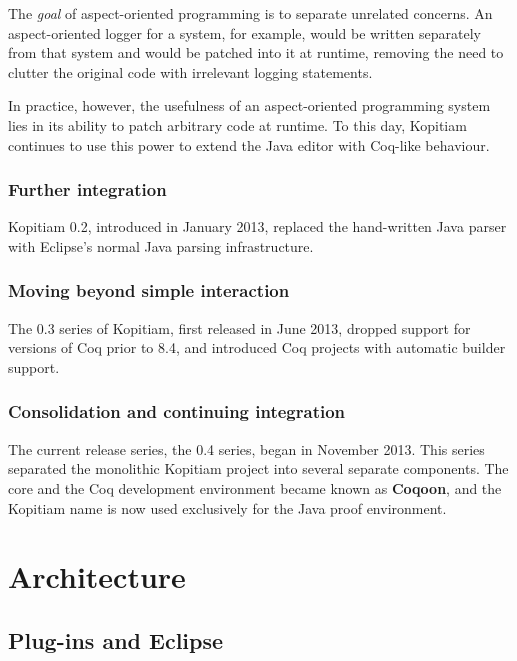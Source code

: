 \documentclass{article}
\newcommand{\name}[1]{\textbf{#1}}
\begin{document}
The \emph{goal} of aspect-oriented programming is to separate unrelated
concerns. An aspect-oriented logger for a system, for example, would be written
separately from that system and would be patched into it at runtime, removing
the need to clutter the original code with irrelevant logging statements.

In practice, however, the usefulness of an aspect-oriented programming system
lies in its ability to patch arbitrary code at runtime. To this day, Kopitiam
continues to use this power to extend the Java editor with Coq-like behaviour.

\subsubsection{Further integration}

Kopitiam 0.2, introduced in January 2013, replaced the hand-written Java parser
with Eclipse's normal Java parsing infrastructure.

\subsubsection{Moving beyond simple interaction}

The 0.3 series of Kopitiam, first released in June 2013, dropped support for
versions of Coq prior to 8.4, and introduced Coq projects with automatic
builder support.

\subsubsection{Consolidation and continuing integration}

The current release series, the 0.4 series, began in November 2013. This series
separated the monolithic Kopitiam project into several separate components. The
core and the Coq development environment became known as \name{Coqoon}, and
the Kopitiam name is now used exclusively for the Java proof environment.

\pagebreak

\section{Architecture}

\subsection{Plug-ins and Eclipse}
\end{document}
